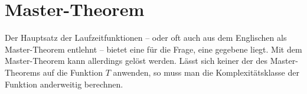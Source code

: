 \documentclass{lehramt-informatik-haupt}
\begin{document}
\let\O=\liO
\let\o=\liOmega
\let\T=\liT
\let\t=\liTheta


\section{Master-Theorem}

Der Hauptsatz der Laufzeitfunktionen – oder oft auch aus dem Englischen
als Master-Theorem entlehnt – bietet eine  für
die Frage,  eine gegebene
 liegt. Mit dem Master-Theorem kann
allerdings  gelöst
werden. Lässt sich keiner der  des
Master-Theorems auf die Funktion $T$ anwenden, so muss man die
Komplexitätsklasse der Funktion anderweitig berechnen.

\liMasterVariablen

\liMasterFaelle

\literatur
\end{document}
